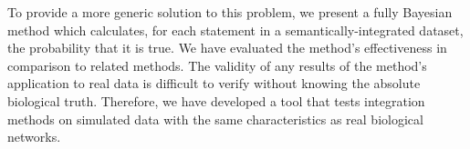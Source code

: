 \documentclass{bioinfo}
\newcommand{\note}[1]{{\color{red}[#1]}}
\newcommand{\REF}{{\color{red}[REF]}}
\begin{document}


To provide a more generic solution to this problem, we present a fully Bayesian method which calculates, for each statement in a semantically-integrated dataset, the probability that it is true. We have evaluated the method's effectiveness in comparison to related methods. The validity of any results of the method's application to real data is difficult to verify without knowing the absolute biological truth. Therefore, we have developed a tool that tests integration methods on simulated data with the same characteristics as real biological networks.
\end{document}
